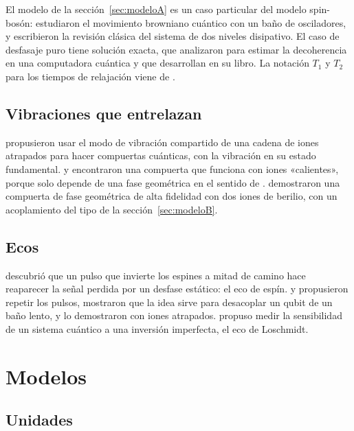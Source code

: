 \documentclass[11pt,a4paper]{article}
\begin{document}
El modelo de la sección~\ref{sec:modeloA} es un caso particular del modelo spin-bosón: \textcite{caldeira1983} estudiaron el movimiento browniano cuántico con un baño de osciladores, y \textcite{leggett1987} escribieron la revisión clásica del sistema de dos niveles disipativo. El caso de desfasaje puro tiene solución exacta, que \textcite{palma1996} analizaron para estimar la decoherencia en una computadora cuántica y que \textcite{breuer2007} desarrollan en su libro. La notación $T_1$ y $T_2$ para los tiempos de relajación viene de \textcite{bloch1946}.

\subsection{Vibraciones que entrelazan}

\textcite{cirac1995} propusieron usar el modo de vibración compartido de una cadena de iones atrapados para hacer compuertas cuánticas, con la vibración en su estado fundamental. \textcite{molmer1999} y \textcite{sorensen1999} encontraron una compuerta que funciona con iones «calientes», porque solo depende de una fase geométrica en el sentido de \textcite{berry1984}. \textcite{leibfried2003} demostraron una compuerta de fase geométrica de alta fidelidad con dos iones de berilio, con un acoplamiento del tipo de la sección~\ref{sec:modeloB}.

\subsection{Ecos}

\textcite{hahn1950} descubrió que un pulso que invierte los espines a mitad de camino hace reaparecer la señal perdida por un desfase estático: el eco de espín. \textcite{carr1954} y \textcite{meiboom1958} propusieron repetir los pulsos, \textcite{viola1998} mostraron que la idea sirve para desacoplar un qubit de un baño lento, y \textcite{biercuk2009} lo demostraron con iones atrapados. \textcite{peres1984} propuso medir la sensibilidad de un sistema cuántico a una inversión imperfecta, el eco de Loschmidt.

\section{Modelos}\label{sec:modelo}

\subsection{Unidades}
\end{document}
